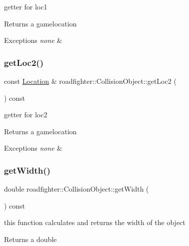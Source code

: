 getter for loc1 \begin{DoxyReturn}{Returns}
a gamelocation 
\end{DoxyReturn}

\begin{DoxyExceptions}{Exceptions}
{\em none} & \\
\hline
\end{DoxyExceptions}
\mbox{\label{classroadfighter_1_1CollisionObject_aa7412cf56663bc98b1454a8ae54ac2b0}} 
\subsubsection{\texorpdfstring{get\+Loc2()}{getLoc2()}}
{\footnotesize\ttfamily const \hyperlink{classroadfighter_1_1Location}{Location} \& roadfighter\+::\+Collision\+Object\+::get\+Loc2 (\begin{DoxyParamCaption}{ }\end{DoxyParamCaption}) const}

getter for loc2 \begin{DoxyReturn}{Returns}
a gamelocation 
\end{DoxyReturn}

\begin{DoxyExceptions}{Exceptions}
{\em none} & \\
\hline
\end{DoxyExceptions}
\mbox{\label{classroadfighter_1_1CollisionObject_ab8692ffb0324d39a96f31c780f7a8172}} 
\subsubsection{\texorpdfstring{get\+Width()}{getWidth()}}
{\footnotesize\ttfamily double roadfighter\+::\+Collision\+Object\+::get\+Width (\begin{DoxyParamCaption}{ }\end{DoxyParamCaption}) const}

this function calculates and returns the width of the object \begin{DoxyReturn}{Returns}
a double 
\end{DoxyReturn}

